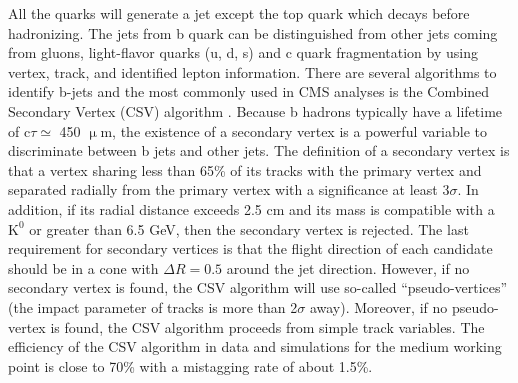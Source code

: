 All the quarks will generate a jet except the top quark which decays before hadronizing. The jets from b quark can be distinguished from other jets coming from gluons, light-flavor quarks (u, d, s) and c quark fragmentation by using vertex, track, and identified lepton information.
There are several algorithms to identify b-jets and the most commonly used in CMS analyses is the Combined Secondary Vertex (CSV) algorithm \cite{b_cds}. Because b hadrons typically have a lifetime of $\mathrm{c}\tau \simeq$ 450 $\upmu$m, the existence of a secondary vertex is a powerful variable to discriminate between b jets and other jets. The definition of a secondary vertex is that a vertex sharing less than 65\% of its tracks with the primary vertex and separated radially from the primary vertex with a significance at least 3$\sigma$. In addition, if its radial distance exceeds 2.5 cm and its mass is compatible with a $\mathrm{K^0}$ or greater than 6.5 GeV, then the secondary vertex is rejected. The last requirement for secondary vertices is that the flight direction of each candidate should be in a cone with $\Delta R=0.5$ around the jet direction.
However, if no secondary vertex is found, the CSV algorithm will use so-called ``pseudo-vertices'' (the impact parameter of tracks is more than 2$\sigma$ away). Moreover, if no pseudo-vertex is found, the CSV algorithm proceeds from simple track variables.
The efficiency of the CSV algorithm in data and simulations for the medium working point is close to 70\% with a mistagging rate of about 1.5\%.

%

